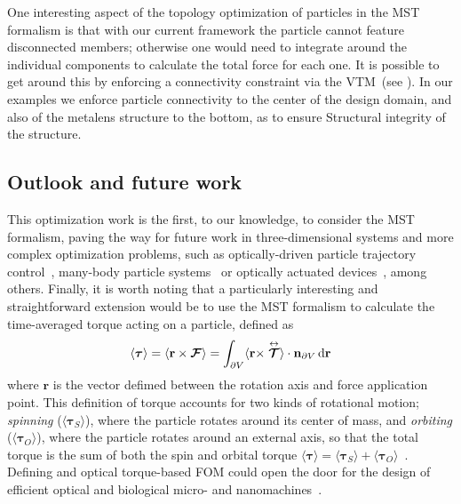 One interesting aspect of the topology optimization of particles in the MST formalism is that with our current framework the particle cannot feature disconnected members; otherwise
one would need to integrate around the individual components to calculate the total force for each one. It is possible to get around this by enforcing 
a connectivity constraint via the VTM~\cite{li_structural_2016}(see ). In our examples
we enforce particle connectivity to the center of the design domain, and also of the metalens structure to the bottom, as to ensure Structural
integrity of the structure.

\subsection*{Outlook and future work}

This optimization work is the first, to our knowledge, to 
consider the MST formalism, paving the way for future work in three-dimensional systems and more complex optimization problems, such as optically-driven particle
trajectory control~\cite{zemanek_perspective_2019, macdonald_microfluidic_2003, shilkin_directional_2017}, many-body particle systems~\cite{bechinger_active_2016, chang_colloquium_2018} or optically actuated devices~\cite{ivanyi_optically_2024}, among others.
Finally, it is worth noting that a particularly interesting and straightforward extension would be to use the MST formalism to calculate the time-averaged torque acting on a particle, defined as~\cite{novotny}
\begin{equation}
    \langle \bm{\tau} \rangle = \langle \mathbf{r} \times \bm{\mathcal{F}} \rangle = \int_{\partial V} \langle \mathbf{r}
     \times \stackrel{\leftrightarrow}{\bm{\mathcal{T}}} \rangle \cdot \mathbf{n}_{\partial V} \mathop{}\!\text{d}\mathbf{r} 
\end{equation}
where $\mathbf{r}$ is the vector defimed between the rotation axis and force application point. This definition of torque accounts
for two kinds of rotational motion; \textit{spinning} ($\langle \bm{\tau}_S \rangle$), where the particle rotates around its center of mass,
and \textit{orbiting} ($\langle \bm{\tau}_O \rangle$), where the particle rotates around an external axis, so that the total torque is the sum
of both the spin and orbital torque $\langle \bm{\tau} \rangle = \langle \bm{\tau}_S \rangle + \langle \bm{\tau}_O \rangle$~\cite{torque}.  Defining
and optical torque-based FOM could open the door for the design of efficient optical and biological micro- and nanomachines~\cite{rotating}.

